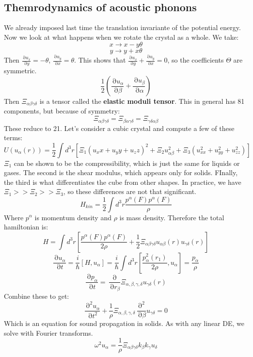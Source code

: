 \documentclass[12 pt]{article}
\DeclareMathOperator {\p} {\partial}
\begin{document}
\subsection*{Themrodynamics of acoustic phonons}
We already imposed last time the translation invariante of the potential energy. Now we look at what happens when we rotate the crystal as a whole. We take:
\[       x \to x - y  \theta        \]
\[       y \to y+ x \theta      \]
Then $\frac{\p u_x}{\p y} = - \theta$, $\frac{\p u_y}{\p x} =  \theta$. This shows that $\frac{\p u_x}{\p y} + \frac{\p u_y}{\p x} = 0$, so the coefficients $\Theta$ are symmetric.
\[      \frac{1}{2} \left(  \frac{\p u_{\alpha}}{\p \beta} + \frac{\p u_{\beta}}{\p \alpha} \right)   \]
Then $\Xi_{\alpha \beta \gamma \delta}$ is a tensor called the \textbf{elastic moduli tensor}. This in general has 81 components, but because of symmetry:
\[      \Xi_{\alpha \beta \gamma \delta} =  \Xi_{\beta \alpha  \gamma \delta} = \Xi_{ \gamma \delta \alpha \beta}    \]
These reduce to 21. Let's consider a cubic crystal and compute a few of these terms:
\[        U(u_{\alpha}(r)) = \frac{1}{2} \int d^3 r \left[  \Xi_1 (u_xx + u_yy + u_zz)^2 + \Xi_2 u^2_{\alpha \beta} + \Xi_3 (u_{xx}^2 + u_{yy}^2 + u_{zz}^2)  \right]        \]
$\Xi_1$ can be shown to be the compressibility, which is just the same for liquids or gases. The second is the shear modulus, which appears only for solids. FInally, the third is what differentiates the cube from other shapes. In practice, we have $\Xi_1 >> \Xi_2 >> \Xi_3$, so these differences are not that significant.
\[     H_{kin}  = \frac{1}{2} \int d^3 r   \frac{p^{\alpha}(F) p^{\alpha}(F)}{\rho}     \]
Where $p^{\alpha}$ is momentum density and $\rho$ is mass density. Therefore the total hamiltonian is:
\[       H =     \int d^3 r  \left[   \frac{p^{\alpha}(F) p^{\alpha}(F)}{2\rho} + \frac{1}{2} \Xi_{\alpha \beta \gamma \delta} u_{\alpha \beta}(r) u_{\gamma \delta}(r)   \right]  \]
\[     \frac{\p u_{\alpha}}{\p t} = \frac{i}{\hbar} \left[  H, u_{\alpha} \right]   = \frac{i}{\hbar} \int d^3 r  \left[ \frac{ p_{\alpha}^2(r_1)}{2\rho} , u_{\alpha}  \right] = \frac{p_{\alpha}}{\rho} \]
\[      \frac{\p p_{\alpha}}{\p t} = \frac{\p}{\p r_{\beta}} \Xi_{\alpha, \beta, \gamma, \delta} u_{\gamma \delta} (r)      \]
Combine these to get:
\[     \frac{\p^2 u_{\alpha}}{\p t^2} + \frac{1}{\rho} \Xi_{\alpha, \beta, \gamma, \delta} \frac{\p^2}{\p \beta } u_{\gamma \delta} = 0  \]
Which is an equation for sound propagation in solids. As with any linear DE, we solve with Fourier transforms.
\[         \omega^2 u_{\alpha} = \frac{1}{\rho} \Xi_{\alpha \beta \gamma \delta} k_{\beta} k_{\gamma} u_{\delta}      \]
\end{document}
